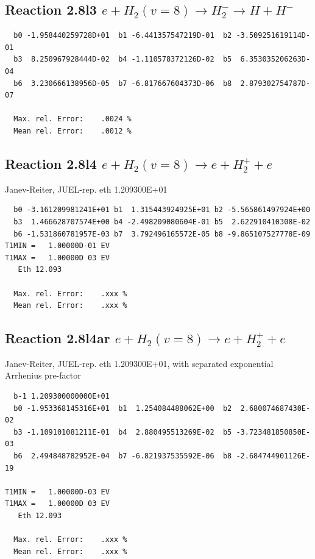 \documentclass[12pt,dvipdfmx]{article}
\begin{document}
\newpage

\subsection{
Reaction 2.8l3
 $ e + H_2(v=8) \rightarrow H_2^- \rightarrow H + H^-$
}


\begin{small}\begin{verbatim}
  b0 -1.958440259728D+01  b1 -6.441357547219D-01  b2 -3.509251619114D-01
  b3  8.250967928444D-02  b4 -1.110578372126D-02  b5  6.353035206263D-04
  b6  3.230666138956D-05  b7 -6.817667604373D-06  b8  2.879302754787D-07

  Max. rel. Error:    .0024 %
  Mean rel. Error:    .0012 %
\end{verbatim}\end{small}

\subsection{
Reaction 2.8l4
 $ e + H_2(v=8) \rightarrow e + H_2^+  + e$
}
Janev-Reiter, JUEL-rep. eth 1.209300E+01

\begin{small}\begin{verbatim}
  b0 -3.161209981241E+01 b1  1.315443924925E+01 b2 -5.565861497924E+00
  b3  1.466628707574E+00 b4 -2.498209080604E-01 b5  2.622910410308E-02
  b6 -1.531860781957E-03 b7  3.792496165572E-05 b8 -9.865107527778E-09
T1MIN =   1.00000D-01 EV
T1MAX =   1.00000D 03 EV
   Eth 12.093

  Max. rel. Error:    .xxx %
  Mean rel. Error:    .xxx %
\end{verbatim}\end{small}

\subsection{
Reaction 2.8l4ar
 $ e + H_2(v=8) \rightarrow e + H_2^+  + e$
}
Janev-Reiter, JUEL-rep. eth 1.209300E+01,
with separated exponential Arrhenius pre-factor

\begin{small}\begin{verbatim}
  b-1 1.209300000000E+01
  b0 -1.953368145316E+01  b1  1.254084488062E+00  b2  2.680074687430E-02
  b3 -1.109101081211E-01  b4  2.880495513269E-02  b5 -3.723481850850E-03
  b6  2.494848782952E-04  b7 -6.821937535592E-06  b8 -2.684744901126E-19

T1MIN =   1.00000D-03 EV
T1MAX =   1.00000D 03 EV
   Eth 12.093

  Max. rel. Error:    .xxx %
  Mean rel. Error:    .xxx %
\end{verbatim}\end{small}
\end{document}
